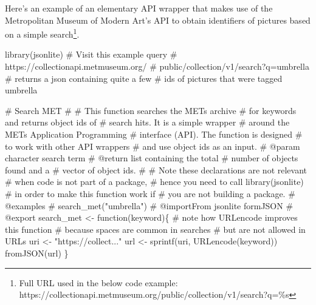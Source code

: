 \documentclass[
  12pt,
  letterpaper,
]{krantz}
\newenvironment{Shaded}{\begin{snugshade}}{\end{snugshade}}
\newcommand{\CommentTok}[1]{\textcolor[rgb]{0.37,0.37,0.37}{#1}}
\newcommand{\ControlFlowTok}[1]{\textcolor[rgb]{0.00,0.23,0.31}{#1}}
\newcommand{\FunctionTok}[1]{\textcolor[rgb]{0.28,0.35,0.67}{#1}}
\newcommand{\NormalTok}[1]{\textcolor[rgb]{0.00,0.23,0.31}{#1}}
\newcommand{\OtherTok}[1]{\textcolor[rgb]{0.00,0.23,0.31}{#1}}
\newcommand{\StringTok}[1]{\textcolor[rgb]{0.13,0.47,0.30}{#1}}
\begin{document}
Here's an example of an elementary API wrapper that makes use
of the Metropolitan Museum of Modern Art's API to obtain identifiers of
pictures based on a simple search\footnote{Full URL used in the below
  code example:
  https://collectionapi.metmuseum.org/public/collection/v1/search?q=\%s}.

\begin{Shaded}
\begin{Highlighting}[]
\FunctionTok{library}\NormalTok{(jsonlite)}
\CommentTok{\# Visit this example query}
\CommentTok{\# https://collectionapi.metmuseum.org/}
\CommentTok{\# public/collection/v1/search?q=umbrella}
\CommentTok{\# returns a json containing quite a few}
\CommentTok{\# ids of pictures that were tagged \textquotesingle{}umbrella\textquotesingle{}}

\CommentTok{\#\textquotesingle{} Search MET}
\CommentTok{\#\textquotesingle{}}
\CommentTok{\#\textquotesingle{} This function searches the MET\textquotesingle{}s archive}
\CommentTok{\#\textquotesingle{} for keywords and returns object ids of}
\CommentTok{\#\textquotesingle{} search hits. It is a simple wrapper}
\CommentTok{\#\textquotesingle{} around the MET\textquotesingle{}s Application Programming}
\CommentTok{\#\textquotesingle{} interface (API). The function is designed }
\CommentTok{\#\textquotesingle{} to work with other API wrappers}
\CommentTok{\#\textquotesingle{} and use object ids as an input.}
\CommentTok{\#\textquotesingle{} @param character search term}
\CommentTok{\#\textquotesingle{} @return list containing the total }
\CommentTok{\#\textquotesingle{} number of objects found and a }
\CommentTok{\#\textquotesingle{} vector of object ids.}
\CommentTok{\#\textquotesingle{}}
\CommentTok{\# Note these declarations are not relevant}
\CommentTok{\# when code is not part of a package, }
\CommentTok{\# hence you need to call library(jsonlite)}
\CommentTok{\# in order to make this function work if}
\CommentTok{\# you are not building a package.}
\CommentTok{\#\textquotesingle{} @examples}
\CommentTok{\#\textquotesingle{} search\_met("umbrella")}
\CommentTok{\#\textquotesingle{} @importFrom jsonlite formJSON}
\CommentTok{\#\textquotesingle{} @export}
\NormalTok{search\_met }\OtherTok{\textless{}{-}} \ControlFlowTok{function}\NormalTok{(keyword)\{}
  \CommentTok{\# note how URLencode improves this function}
  \CommentTok{\# because spaces are common in searches}
  \CommentTok{\# but are not allowed in URLs}
\NormalTok{  uri }\OtherTok{\textless{}{-}} \StringTok{"https://collect..."}
\NormalTok{  url }\OtherTok{\textless{}{-}} \FunctionTok{sprintf}\NormalTok{(uri,}
  \FunctionTok{URLencode}\NormalTok{(keyword))}
  \FunctionTok{fromJSON}\NormalTok{(url)}
\NormalTok{\}}
\end{Highlighting}
\end{Shaded}
\end{document}
